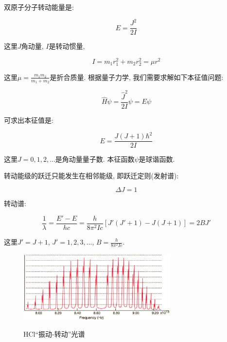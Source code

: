 双原子分子转动能量是:

\begin{equation*}
E = \frac{J^2}{2I}
\end{equation*}

这里$J$角动量, $I$是转动惯量,

\begin{equation*}
I = m_1 r_1^2 + m_2 r_2^2=\mu r^2
\end{equation*}

这里$\mu = \frac{m_1m_2}{m_1 + m_2}$是折合质量. 根据量子力学,
我们需要求解如下本征值问题:

\begin{equation*}
\hat H \psi = \frac{\hat J^2}{2I} \psi =  E \psi
\end{equation*}

可求出本征值是:

\begin{equation*}
E = \frac{J(J+1)\hbar^2}{2I}
\end{equation*}

这里$J=0, 1, 2, ...$是角动量量子数. 本征函数$\psi$是球谐函数.

转动能级的跃迁只能发生在相邻能级, 即跃迁定则(发射谱):

\begin{equation*}
    \Delta J =1
\end{equation*}

转动谱:

\begin{equation*}
\frac{1}{\lambda} = \frac{E' - E}{hc} =\frac{h}{8\pi^2 I c}\left[
J'(J'+1)-J(J+1) \right]=2BJ'
\end{equation*}

这里$J'= J+1$, $J'=1,2,3,...$, $B=\frac{h}{8\pi^2 Ic}$.


\begin{figure}[h]
\begin{center}
  \includegraphics[width=8cm]{Spectrum/rotation-energy-spectrum.ps}\\
  \caption{HCl``振动-转动''光谱}\label{HCl rotation energy spectrum}
\end{center}
\end{figure}


